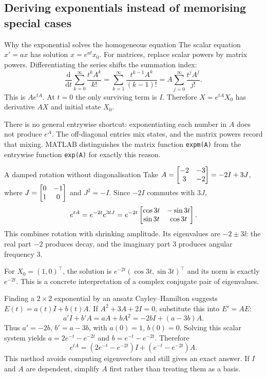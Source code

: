 \subsection{Deriving exponentials instead of memorising special cases}
\begin{concept}{Why the exponential solves the homogeneous equation}
The scalar equation $x'=ax$ has solution $x=e^{at}x_0$. For matrices, replace scalar powers by matrix powers. Differentiating the series shifts the summation index:
\[\frac{\mathrm d}{\mathrm dt}\sum_{k=0}^{\infty}\frac{t^kA^k}{k!}
=\sum_{k=1}^{\infty}\frac{t^{k-1}A^k}{(k-1)!}
=A\sum_{j=0}^{\infty}\frac{t^jA^j}{j!}.\]
This is $Ae^{tA}$. At $t=0$ the only surviving term is $I$. Therefore $X=e^{tA}X_0$ has derivative $AX$ and initial state $X_0$.

There is no general entrywise shortcut: exponentiating each number in $A$ does not produce $e^A$. The off-diagonal entries mix states, and the matrix powers record that mixing. MATLAB distinguishes the matrix function \texttt{expm(A)} from the entrywise function \texttt{exp(A)} for exactly this reason.
\end{concept}
\begin{worked}{A damped rotation without diagonalisation}
Take $A=\begin{bmatrix}-2&-3\\3&-2\end{bmatrix}=-2I+3J$, where $J=\begin{bmatrix}0&-1\\1&0\end{bmatrix}$ and $J^2=-I$. Since $-2I$ commutes with $3J$,
\[e^{tA}=e^{-2t}e^{3tJ}=e^{-2t}\begin{bmatrix}\cos3t&-\sin3t\\\sin3t&\cos3t\end{bmatrix}.\]
This combines rotation with shrinking amplitude. Its eigenvalues are $-2\pm3\ii$: the real part $-2$ produces decay, and the imaginary part $3$ produces angular frequency $3$.

For $X_0=(1,0)^{\top}$, the solution is $e^{-2t}(\cos3t,\sin3t)^{\top}$ and its norm is exactly $e^{-2t}$. This is a concrete interpretation of a complex conjugate pair of eigenvalues.
\end{worked}
\begin{method}{Finding a $2\times2$ exponential by an ansatz}
Cayley--Hamilton suggests $E(t)=a(t)I+b(t)A$. If $A^2+3A+2I=0$, substitute this into $E'=AE$:
\[a'I+b'A=aA+bA^2=-2bI+(a-3b)A.\]
Thus $a'=-2b$, $b'=a-3b$, with $a(0)=1$, $b(0)=0$. Solving this scalar system yields $a=2e^{-t}-e^{-2t}$ and $b=e^{-t}-e^{-2t}$. Therefore
\[e^{tA}=(2e^{-t}-e^{-2t})I+(e^{-t}-e^{-2t})A.\]
This method avoids computing eigenvectors and still gives an exact answer. If $I$ and $A$ are dependent, simplify $A$ first rather than treating them as a basis.
\end{method}
